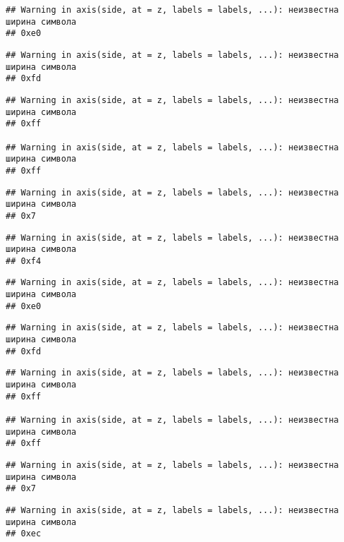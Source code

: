 \documentclass[
]{article}
\begin{document}
\begin{verbatim}
## Warning in axis(side, at = z, labels = labels, ...): неизвестна ширина символа
## 0xe0
\end{verbatim}

\begin{verbatim}
## Warning in axis(side, at = z, labels = labels, ...): неизвестна ширина символа
## 0xfd
\end{verbatim}

\begin{verbatim}
## Warning in axis(side, at = z, labels = labels, ...): неизвестна ширина символа
## 0xff

## Warning in axis(side, at = z, labels = labels, ...): неизвестна ширина символа
## 0xff
\end{verbatim}

\begin{verbatim}
## Warning in axis(side, at = z, labels = labels, ...): неизвестна ширина символа
## 0x7
\end{verbatim}

\begin{verbatim}
## Warning in axis(side, at = z, labels = labels, ...): неизвестна ширина символа
## 0xf4
\end{verbatim}

\begin{verbatim}
## Warning in axis(side, at = z, labels = labels, ...): неизвестна ширина символа
## 0xe0
\end{verbatim}

\begin{verbatim}
## Warning in axis(side, at = z, labels = labels, ...): неизвестна ширина символа
## 0xfd
\end{verbatim}

\begin{verbatim}
## Warning in axis(side, at = z, labels = labels, ...): неизвестна ширина символа
## 0xff

## Warning in axis(side, at = z, labels = labels, ...): неизвестна ширина символа
## 0xff
\end{verbatim}

\begin{verbatim}
## Warning in axis(side, at = z, labels = labels, ...): неизвестна ширина символа
## 0x7
\end{verbatim}

\begin{verbatim}
## Warning in axis(side, at = z, labels = labels, ...): неизвестна ширина символа
## 0xec
\end{verbatim}
\end{document}
